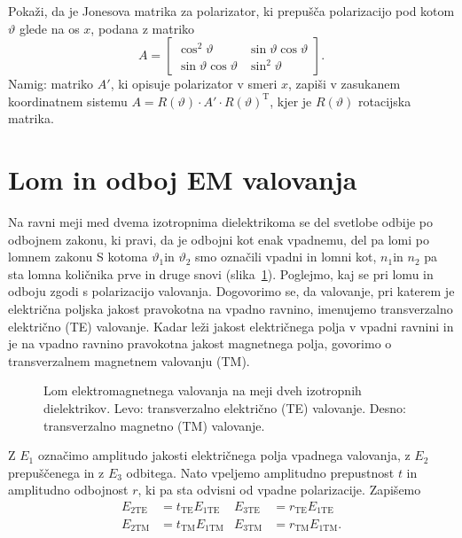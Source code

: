 \begin{definition}
Pokaži, da je Jonesova matrika za polarizator,
ki prepušča polarizacijo pod kotom $\vartheta$ glede na os $x$, podana z matriko
\begin{equation}
A=\left[\begin{array}{cc}
\cos^{2}\vartheta & \sin\vartheta\cos\vartheta\\
\sin\vartheta\cos\vartheta & \sin^{2}\vartheta
\end{array}\right].
\end{equation}
Namig: matriko $A'$, ki opisuje polarizator v smeri $x$, zapiši v zasukanem
koordinatnem sistemu $A=R(\vartheta) \cdot {A'}\cdot R(\vartheta)^\textrm{T}$, 
kjer je $R(\vartheta)$ rotacijska matrika.
\end{definition}

\section{Lom in odboj EM valovanja}
Na ravni meji med dvema izotropnima dielektrikoma se del svetlobe
odbije po odbojnem zakonu, ki pravi, da je odbojni kot enak vpadnemu, 
del pa lomi po lomnem zakonu 
S kotoma $\vartheta_{1}$in $\vartheta_{2}$ smo označili vpadni in lomni
kot, $n_{1}$in $n_{2}$ pa sta lomna količnika prve in druge snovi (slika~\ref{fig:Lom}).
Poglejmo, kaj se pri lomu in odboju zgodi s polarizacijo valovanja.
Dogovorimo se, da valovanje, pri katerem je električna poljska jakost pravokotna 
na vpadno ravnino, imenujemo transverzalno električno (TE) 
valovanje. Kadar leži jakost električnega polja v
vpadni ravnini in je na vpadno ravnino pravokotna jakost magnetnega polja,
govorimo o transverzalnem magnetnem valovanju (TM).\\

\begin{figure}[h]
\centering {} 
  
\caption{Lom elektromagnetnega valovanja na meji dveh izotropnih dielektrikov. 
Levo: transverzalno električno (TE) valovanje. Desno: transverzalno magnetno (TM) valovanje.}
\label{fig:Lom}
\end{figure}

Z $E_1$ označimo amplitudo jakosti električnega polja vpadnega valovanja, 
z $E_2$ prepuščenega in z $E_3$ odbitega.
Nato vpeljemo amplitudno prepustnost $t$ in amplitudno odbojnost $r$, 
ki pa sta odvisni od vpadne polarizacije. Zapišemo
\begin{align}
E_{2\mathrm{TE}} & =t_{\mathrm{TE}}E_{1\mathrm{TE}} & E_{3\mathrm{TE}} &=r_{\mathrm{TE}}E_{1\mathrm{TE}}\\
E_{2\mathrm{TM}} & =t_{\mathrm{TM}}E_{1\mathrm{TM}} & E_{3\mathrm{TM}}&=r_{\mathrm{TM}}E_{1\mathrm{TM}}.
\end{align}

